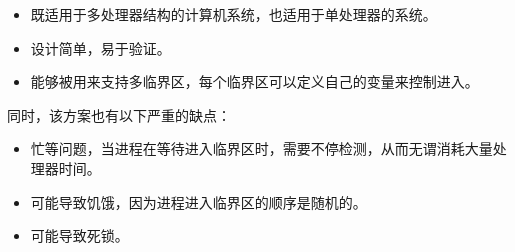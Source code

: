 {{{            \begin{itemize}
                \item 既适用于多处理器结构的计算机系统，也适用于单处理器的系统。
                \item 设计简单，易于验证。
                \item 能够被用来支持多临界区，每个临界区可以定义自己的变量来控制进入。
            \end{itemize}

            同时，该方案也有以下严重的缺点：

            \begin{itemize}
                \item 忙等问题，当进程在等待进入临界区时，需要不停检测，从而无谓消耗大量处理器时间。
                \item 可能导致饥饿，因为进程进入临界区的顺序是随机的。
                \item 可能导致死锁。
            \end{itemize}
        }
    }
}
